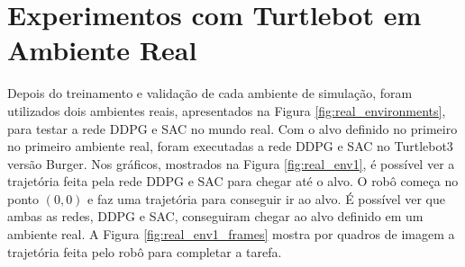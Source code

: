 
\section{Experimentos com Turtlebot em Ambiente Real}

Depois do treinamento e validação de cada ambiente de simulação, foram utilizados dois ambientes reais, apresentados na Figura \ref{fig:real_environments}, para testar a rede DDPG e SAC no mundo real.
Com o alvo definido no primeiro no primeiro ambiente real, foram executadas a rede DDPG e SAC no Turtlebot3 versão Burger.
Nos gráficos, mostrados na Figura \ref{fig:real_env1}, é possível ver a trajetória feita pela rede DDPG e SAC  para chegar até o alvo.
O robô começa no ponto $(0,0)$ e faz uma trajetória para conseguir ir ao alvo.
É possível ver que ambas as redes, DDPG e SAC, conseguiram chegar ao alvo definido em um ambiente real.
A Figura \ref{fig:real_env1_frames} mostra por quadros de imagem a trajetória feita pelo robô para completar a tarefa.

